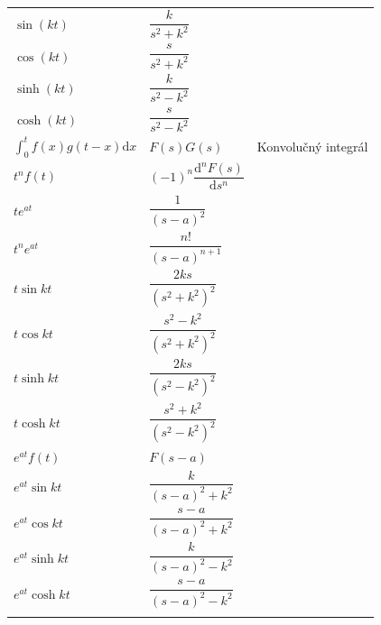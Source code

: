 \documentclass[a4paper, 10pt, ]{article}
\begin{document}
\begin{longtable}[l]{p{3.7cm} @{} p{5.9cm} p{2.8cm}}
    $\sin(kt)$                               & $\dfrac{k}{s^2+k^2}$                  \\[4mm]
    $\cos(kt)$                               & $\dfrac{s}{s^2+k^2}$                  \\[4mm]
    $\sinh(kt)$                              & $\dfrac{k}{s^2-k^2}$                  \\[4mm]
    $\cosh(kt)$                              & $\dfrac{s}{s^2-k^2}$                  \\[4mm]
    \midrule \addlinespace[4mm]


    $\displaystyle{\int_0^t f(x)g(t-x) \text{d}x}$ & $F(s)G(s)$                     & {\color{Gray} \scriptsize Konvolučný integrál} \\[4mm]
    \midrule \addlinespace[4mm]


    $t^nf(t)$                               & $(-1)^n\dfrac{\text{d}^n F(s)}{\text{d} s^n}$ \\[4mm]
    $te^{at}$                               & $\dfrac{1}{(s-a)^2}$                  \\[4mm]
    $t^ne^{at}$                             & $\dfrac{n!}{(s-a)^{n+1}}$             \\[4mm]
    $t\sin kt$                              & $\dfrac{2ks}{(s^2+k^2)^2}$            \\[4mm]
    $t\cos kt$                              & $\dfrac{s^2-k^2}{(s^2+k^2)^2}$        \\[4mm]
    $t\sinh kt$                             & $\dfrac{2ks}{(s^2-k^2)^2}$            \\[4mm]
    $t\cosh kt$                             & $\dfrac{s^2+k^2}{(s^2-k^2)^2}$        \\[4mm]
    \midrule \addlinespace[4mm]

    
    $e^{at}f(t)$                            & $F(s-a)$                              \\[4mm]
    $e^{at}\sin kt$                         & $\dfrac{k}{(s-a)^2+k^2}$              \\[4mm]
    $e^{at}\cos kt$                         & $\dfrac{s-a}{(s-a)^2+k^2}$            \\[4mm]
    $e^{at}\sinh kt$                        & $\dfrac{k}{(s-a)^2-k^2}$              \\[4mm]
    $e^{at}\cosh kt$                        & $\dfrac{s-a}{(s-a)^2-k^2}$            \\[4mm]
    \midrule \addlinespace[4mm]



\end{longtable}
\end{document}

